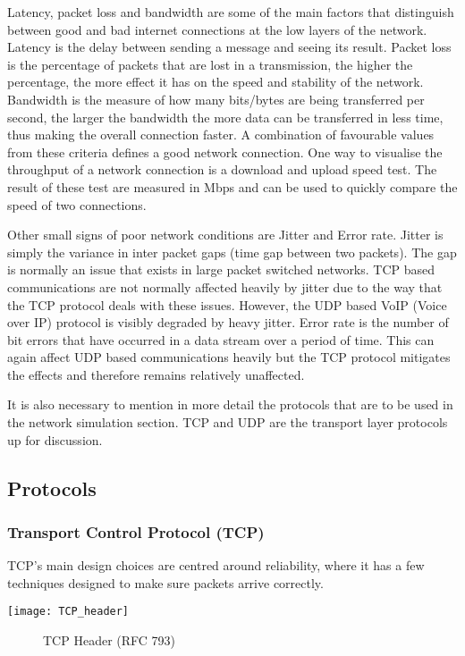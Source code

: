 Latency, packet loss and bandwidth are some of the main factors that distinguish between good and bad internet connections at the low layers of the network.  Latency is the delay between sending a message and seeing its result. Packet loss is the percentage of packets that are lost in a transmission, the higher the percentage, the more effect it has on the speed and stability of the network. Bandwidth is the measure of how many bits/bytes are being transferred per second, the larger the bandwidth the more data can be transferred in less time, thus making the overall connection faster. A combination of favourable values from these criteria defines a good network connection. One way to visualise the throughput of a network connection is a download and upload speed test. The result of these test are measured in Mbps and can be used to quickly compare the speed of two connections.

Other small signs of poor network conditions are Jitter and Error rate. Jitter is simply the variance in inter packet gaps (time gap between two packets). The gap is normally an issue that exists in large packet switched networks. TCP based communications are not normally affected heavily by jitter due to the way that the TCP protocol deals with these issues. However, the UDP based VoIP (Voice over IP) protocol is visibly degraded by heavy jitter. Error rate is the number of bit errors that have occurred in a data stream over a period of time. This can again affect UDP based communications heavily but the TCP protocol mitigates the effects and therefore remains relatively unaffected.

It is also necessary to mention in more detail the protocols that are to be used in the network simulation section. TCP \citep{TCP} and UDP \citep{UDP} are the transport layer protocols up for discussion. 

\clearpage
\subsection{Protocols}
\subsubsection{Transport Control Protocol (TCP)}
TCP's main design choices are centred around reliability, where it has a few techniques designed to make sure packets arrive correctly. 


\begin{center}
	\texttt{[image: TCP\_header]}
	\begin{figure}[h]
		\caption{TCP Header (RFC 793)}
	\end{figure}	
\end{center}


